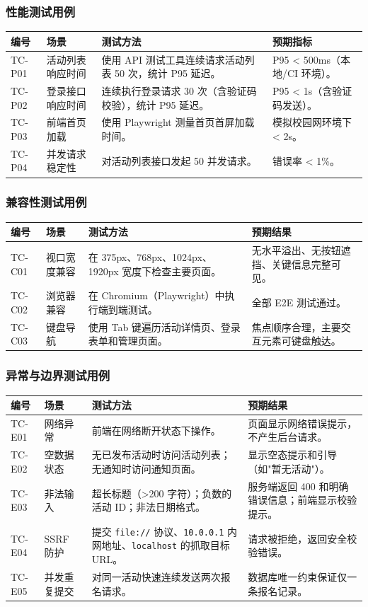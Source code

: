 \documentclass[12pt,a4paper]{ctexart}
\begin{document}
\subsubsection{性能测试用例}
\begin{longtable}{p{1.0cm}p{2.8cm}p{4.5cm}p{4.5cm}}
\toprule 编号 & 场景 & 测试方法 & 预期指标 \\\midrule\endhead
TC-P01 & 活动列表响应时间 & 使用 API 测试工具连续请求活动列表 50 次，统计 P95 延迟。 & P95 < 500ms（本地/CI 环境）。 \\
TC-P02 & 登录接口响应时间 & 连续执行登录请求 30 次（含验证码校验），统计 P95 延迟。 & P95 < 1s（含验证码发送）。 \\
TC-P03 & 前端首页加载 & 使用 Playwright 测量首页首屏加载时间。 & 模拟校园网环境下 < 2s。 \\
TC-P04 & 并发请求稳定性 & 对活动列表接口发起 50 并发请求。 & 错误率 < 1\%。 \\
\bottomrule
\end{longtable}

\subsubsection{兼容性测试用例}
\begin{longtable}{p{1.0cm}p{2.8cm}p{4.5cm}p{4.5cm}}
\toprule 编号 & 场景 & 测试方法 & 预期结果 \\\midrule\endhead
TC-C01 & 视口宽度兼容 & 在 375px、768px、1024px、1920px 宽度下检查主要页面。 & 无水平溢出、无按钮遮挡、关键信息完整可见。 \\
TC-C02 & 浏览器兼容 & 在 Chromium（Playwright）中执行端到端测试。 & 全部 E2E 测试通过。 \\
TC-C03 & 键盘导航 & 使用 Tab 键遍历活动详情页、登录表单和管理页面。 & 焦点顺序合理，主要交互元素可键盘触达。 \\
\bottomrule
\end{longtable}

\subsubsection{异常与边界测试用例}
\begin{longtable}{p{1.0cm}p{2.8cm}p{4.5cm}p{4.5cm}}
\toprule 编号 & 场景 & 测试方法 & 预期结果 \\\midrule\endhead
TC-E01 & 网络异常 & 前端在网络断开状态下操作。 & 页面显示网络错误提示，不产生后台请求。 \\
TC-E02 & 空数据状态 & 无已发布活动时访问活动列表；无通知时访问通知页面。 & 显示空态提示和引导（如"暂无活动"）。 \\
TC-E03 & 非法输入 & 超长标题（>200 字符）；负数的活动 ID；非法日期格式。 & 服务端返回 400 和明确错误信息；前端显示校验提示。 \\
TC-E04 & SSRF 防护 & 提交 \texttt{file://} 协议、\texttt{10.0.0.1} 内网地址、\texttt{localhost} 的抓取目标 URL。 & 请求被拒绝，返回安全校验错误。 \\
TC-E05 & 并发重复提交 & 对同一活动快速连续发送两次报名请求。 & 数据库唯一约束保证仅一条报名记录。 \\
\bottomrule
\end{longtable}
\end{document}
